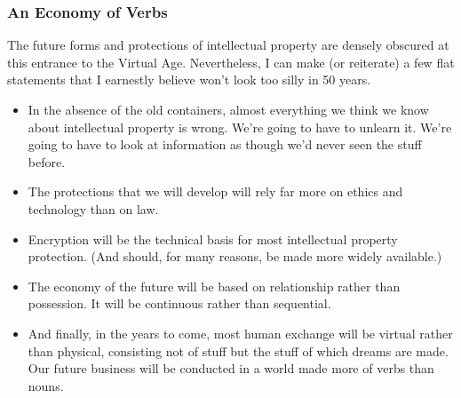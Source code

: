 \documentclass[
]{article}
\begin{document}
\hypertarget{header-n407}{%
\subsubsection{An Economy of Verbs}\label{header-n407}}

The future forms and protections of intellectual property are densely
obscured at this entrance to the Virtual Age. Nevertheless, I can make
(or reiterate) a few flat statements that I earnestly believe won't look
too silly in 50 years.

\begin{itemize}
\item
  In the absence of the old containers, almost everything we think we
  know about intellectual property is wrong. We're going to have to
  unlearn it. We're going to have to look at information as though we'd
  never seen the stuff before.
\item
  The protections that we will develop will rely far more on ethics and
  technology than on law.
\item
  Encryption will be the technical basis for most intellectual property
  protection. (And should, for many reasons, be made more widely
  available.)
\item
  The economy of the future will be based on relationship rather than
  possession. It will be continuous rather than sequential.
\item
  And finally, in the years to come, most human exchange will be virtual
  rather than physical, consisting not of stuff but the stuff of which
  dreams are made. Our future business will be conducted in a world made
  more of verbs than nouns.
\end{itemize}
\end{document}
